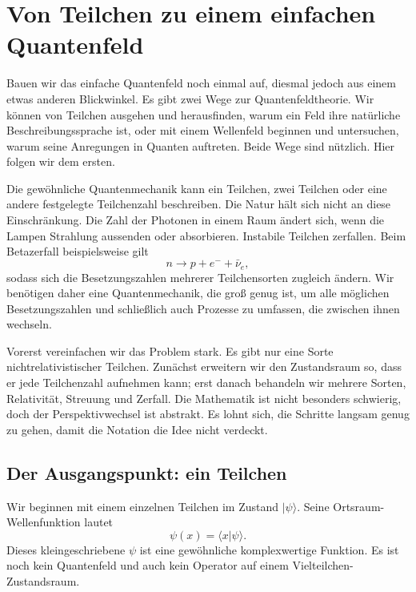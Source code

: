 \chapter{Von Teilchen zu einem einfachen Quantenfeld}

Bauen wir das einfache Quantenfeld noch einmal auf, diesmal jedoch aus einem etwas anderen Blickwinkel. Es gibt zwei Wege zur Quantenfeldtheorie. Wir können von Teilchen ausgehen und herausfinden, warum ein Feld ihre natürliche Beschreibungssprache ist, oder mit einem Wellenfeld beginnen und untersuchen, warum seine Anregungen in Quanten auftreten. Beide Wege sind nützlich. Hier folgen wir dem ersten.

Die gewöhnliche Quantenmechanik kann ein Teilchen, zwei Teilchen oder eine andere festgelegte Teilchenzahl beschreiben. Die Natur hält sich nicht an diese Einschränkung. Die Zahl der Photonen in einem Raum ändert sich, wenn die Lampen Strahlung aussenden oder absorbieren. Instabile Teilchen zerfallen. Beim Betazerfall beispielsweise gilt
\begin{equation}
n\longrightarrow p+e^-+\bar{\nu}_e,
\end{equation}
sodass sich die Besetzungszahlen mehrerer Teilchensorten zugleich ändern. Wir benötigen daher eine Quantenmechanik, die groß genug ist, um alle möglichen Besetzungszahlen und schließlich auch Prozesse zu umfassen, die zwischen ihnen wechseln.

Vorerst vereinfachen wir das Problem stark. Es gibt nur eine Sorte nichtrelativistischer Teilchen. Zunächst erweitern wir den Zustandsraum so, dass er jede Teilchenzahl aufnehmen kann; erst danach behandeln wir mehrere Sorten, Relativität, Streuung und Zerfall. Die Mathematik ist nicht besonders schwierig, doch der Perspektivwechsel ist abstrakt. Es lohnt sich, die Schritte langsam genug zu gehen, damit die Notation die Idee nicht verdeckt.

\section{Der Ausgangspunkt: ein Teilchen}

Wir beginnen mit einem einzelnen Teilchen im Zustand \(|\psi\rangle\). Seine Ortsraum-Wellenfunktion lautet
\begin{equation}
\psi(x)=\langle x|\psi\rangle.
\label{eq:l07-wavefunction}
\end{equation}
Dieses kleingeschriebene \(\psi\) ist eine gewöhnliche komplexwertige Funktion. Es ist noch kein Quantenfeld und auch kein Operator auf einem Vielteilchen-Zustandsraum.

